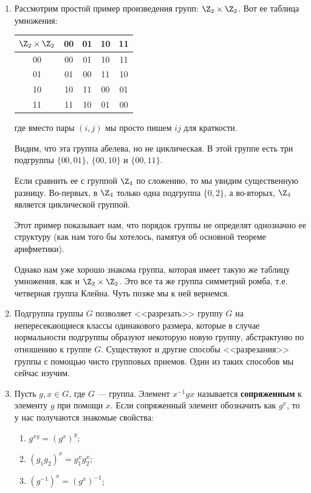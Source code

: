 \begin{enumerate}
\item Рассмотрим простой пример произведения групп: $\Z_2\times\Z_2$. Вот ее таблица умножения:

\begin{center}
\begin{tabular}{c|cccc}
$\Z_2\times\Z_2$ & 00 & 01 & 10 & 11\\  \hline
00 & 00 & 01 & 10 & 11 \\
01 & 01 & 00 & 11 & 10 \\
10 & 10 & 11 & 00 & 01 \\
11 & 11 & 10 & 01 & 00
\end{tabular}
\end{center}
где вместо пары $(i,j)$ мы просто пишем $ij$ для краткости.

Видим, что эта группа абелева, но не циклическая. В этой группе есть три подгруппы $\{00,01\}$, $\{00,10\}$ и $\{00,11\}$.

Если сравнить ее с группой $\Z_4$ по сложению, то мы увидим существенную разницу. Во-первых, в $\Z_4$ только одна подгруппа $\{0,2\}$, а во-вторых, $\Z_4$ является циклической группой.

Этот пример показывает нам, что порядок группы не определят однозначно ее структуру (как нам того бы хотелось, памятуя об основной теореме арифметики).

Однако нам уже хорошо знакома группа, которая имеет такую же таблицу умножения, как и $\Z_2\times\Z_2$. Это все та же группа симметрий ромба, т.е. четверная группа Клейна. Чуть позже мы к ней вернемся.




\item Подгруппа группы $G$ позволяет <<разрезать>> группу $G$ на непересекающиеся классы одинакового размера, которые в случае нормальности подгруппы образуют некоторую новую группу, абстрактуню по отношению к группе $G$. Существуют и другие способы <<разрезания>> группы с помощью чисто групповых приемов. Один из таких способов мы сейчас изучим.

\item Пусть $g,x\in G$, где $G$ --- группа. Элемент $x^{-1}gx$ называется \textbf{сопряженным} к элементу $g$ при помощи $x$. Если сопряженный элемент обозначить как $g^x$, то у нас получаются знакомые свойства:
\begin{enumerate}[1)]
\item $g^{xy}=(g^x)^y$;
\item $(g_1g_2)^x=g_1^xg_2^x$;
\item $(g^{-1})^x=(g^x)^{-1}$;
\end{enumerate}


\end{enumerate}
